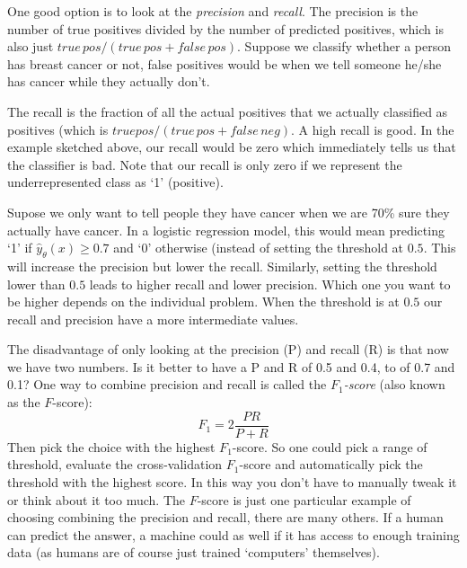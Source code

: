 \documentclass[a4paper, 10pt,hidelinks]{article}
\begin{document}
One good option is to look at the \emph{precision} and \emph{recall}. The precision is the number of true positives divided by the number of predicted positives, which is also just $true\,pos / (true\,pos + false\,pos)$. Suppose we classify whether a person has breast cancer or not, false positives would be when we tell someone he/she has cancer while they actually don't.

The recall is the fraction of all the actual positives that we actually classified as positives (which is $ true pos/(true\,pos + false\,neg)$. A high recall is good. In the example sketched above, our recall would be zero which immediately tells us that the classifier is bad. Note that our recall is only zero if we represent the underrepresented class as `1' (positive).


Supose we only want to tell people they have cancer when we are 70\% sure they actually have cancer. In a logistic regression model, this would mean predicting `1' if $\hat{y}_{\theta}(x) \geq 0.7$ and `0' otherwise (instead of setting the threshold at $0.5$. This will increase the precision but lower the recall. Similarly, setting the threshold lower than $0.5$ leads to higher recall and lower precision. Which one you want to be higher depends on the individual problem. When the threshold is at $0.5$ our recall and precision have a more intermediate values. 

The disadvantage of only looking at the precision (P) and recall (R) is that now we have two numbers. Is it better to have a P and R of 0.5 and 0.4, to of 0.7 and 0.1? One way to combine precision and recall is called the \emph{$F_1$-score} (also known as the $F$-score):
\begin{equation}
F_1 = 2 \frac{PR}{P + R}
\end{equation}
Then pick the choice with the highest $F_1$-score. So one could pick a range of threshold, evaluate the cross-validation $F_1$-score and automatically pick the threshold with the highest score. In this way you don't have to manually tweak it or think about it too much. The $F$-score is just one particular example of choosing combining the precision and recall, there are many others. If a human can predict the answer, a machine could as well if it has access to enough training data (as humans are of course just trained `computers' themselves). 
\end{document}
